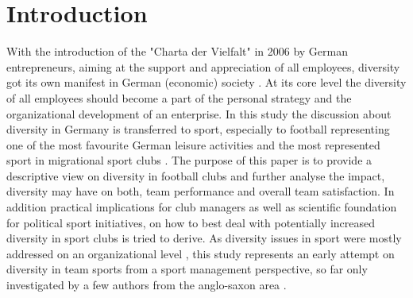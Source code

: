\documentclass[	
	12pt, %
	a4paper, %
]{scrartcl}\usepackage[]{graphicx}\usepackage[]{color}
\title{\mytitle}
\subtitle{Final paper}
\author{
        N. McCown, M. Metz, T. Prenzel, C. Xi\\
        Institute of Sport Economics and Sport Management\\
        German Sport University Cologne\\
        }
\date{\today}
\begin{document}




\restoregeometry %
\reversemarginpar %
\newpage %
\setcounter{page}{2} %
\tableofcontents %
\newpage %
\newpage
{} %
\setcounter{page}{1} %








\section{Introduction}
With the introduction of the "Charta der Vielfalt" in 2006 by German entrepreneurs, aiming at the support and appreciation of all employees, diversity got its own manifest in German (economic) society \cite{Vielfalt2006}. At its core level the diversity of all employees should become a part of the personal strategy and the organizational development of an enterprise. In this study the discussion about diversity in Germany is transferred to sport, especially to football representing one of the most favourite German leisure activities and the most represented sport in migrational sport clubs \cite{Breuer2010}. The purpose of this paper is to provide a descriptive view on diversity in football clubs and further analyse the impact, diversity may have on both, team performance and overall team satisfaction. 
In addition practical implications for club managers as well as scientific foundation for political sport initiatives, on how to best deal with potentially increased diversity in sport clubs is tried to derive. As diversity issues in sport were mostly addressed on an organizational level \cite{Knoppers2008, Cunningham2004, Cunningham2007a, Cunningham2007b}, this study represents an early attempt on diversity in team sports from a sport management perspective, so far only investigated by a few authors from the anglo-saxon area \cite{Timmerman2000, Waltemyer2006}.
\end{document}
